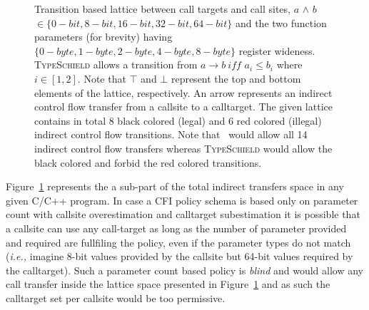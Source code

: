 \begin{figure}[h!]
{

}
\caption{Transition based lattice between call targets and call sites,
$a$ $\wedge$ $b$ $\in \{0-bit, 8-bit, 16-bit, 32-bit, 64-bit\}$ and the two 
function parameters (for brevity) having $\{0-byte, 1-byte, 2-byte, 4-byte, 8-byte\}$ register wideness. 
\textsc{TypeSchield} allows a transition from $a \rightarrow b \ iff$ $a_{i} \le b_{i}$ where $i \in [1, 2]$.
Note that $\top$ and $\bot$ represent the top and bottom elements of the lattice, respectively.
An arrow represents an indirect control flow transfer from a callsite to a calltarget. 
The given lattice contains in total 8 black colored (legal) and 6 red colored (illegal) indirect control flow transitions. 
Note that~\cite{veen:typearmor} would allow all 14 indirect control flow transfers 
whereas \textsc{TypeSchield} would allow the black colored and 
forbid the red colored transitions.}
\label{fig:lattice3264}
\end{figure}

Figure~\ref{fig:lattice3264} represents the a sub-part of the total indirect transfers space in any given C/C++ program. 
In case a CFI policy schema is based only on parameter count with callsite overestimation and calltarget subestimation 
it is possible that a callsite can use any call-target as long as the number of 
parameter provided and required are fullfiling the policy, even if the parameter types do not match 
(\textit{i.e.,} imagine 8-bit values provided by the callsite but 64-bit values required by the calltarget). 
Such a parameter count based policy is \textit{blind} and would allow any call transfer 
inside the lattice space presented in Figure~\ref{fig:lattice3264} and as such the calltarget set per 
callsite would be too permissive.

